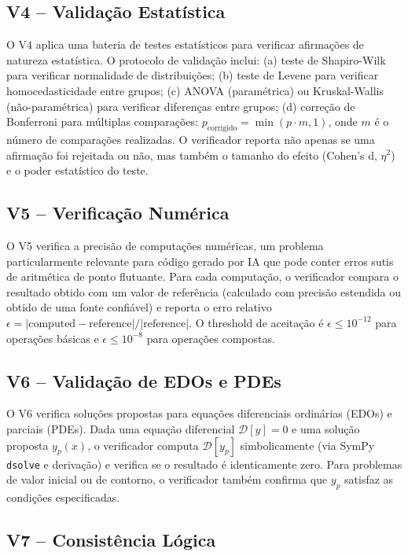 \documentclass[12pt,a4paper,sumario=tradicional,openany]{abntex2}
\begin{document}
\subsection{V4 -- Validação Estatística}

O V4 aplica uma bateria de testes estatísticos para verificar afirmações de natureza estatística. O protocolo de validação inclui: (a) teste de Shapiro-Wilk para verificar normalidade de distribuições; (b) teste de Levene para verificar homocedasticidade entre grupos; (c) ANOVA (paramétrica) ou Kruskal-Wallis (não-paramétrica) para verificar diferenças entre grupos; (d) correção de Bonferroni para múltiplas comparações: $p_{\text{corrigido}} = \min(p \cdot m, 1)$, onde $m$ é o número de comparações realizadas. O verificador reporta não apenas se uma afirmação foi rejeitada ou não, mas também o tamanho do efeito (Cohen's d, $\eta^2$) e o poder estatístico do teste.

\subsection{V5 -- Verificação Numérica}

O V5 verifica a precisão de computações numéricas, um problema particularmente relevante para código gerado por IA que pode conter erros sutis de aritmética de ponto flutuante. Para cada computação, o verificador compara o resultado obtido com um valor de referência (calculado com precisão estendida ou obtido de uma fonte confiável) e reporta o erro relativo $\epsilon = |\text{computed} - \text{reference}| / |\text{reference}|$. O threshold de aceitação é $\epsilon \leq 10^{-12}$ para operações básicas e $\epsilon \leq 10^{-8}$ para operações compostas.

\subsection{V6 -- Validação de EDOs e PDEs}

O V6 verifica soluções propostas para equações diferenciais ordinárias (EDOs) e
parciais (PDEs). Dada uma equação diferencial $\mathcal{D}[y] = 0$ e uma solução
proposta $y_p(x)$, o verificador computa $\mathcal{D}[y_p]$ simbolicamente (via
SymPy \texttt{dsolve} e derivação) e verifica se o resultado é identicamente zero.
Para problemas de valor inicial ou de contorno, o verificador também confirma que
$y_p$ satisfaz as condições especificadas.

\subsection{V7 -- Consistência Lógica}
\end{document}
